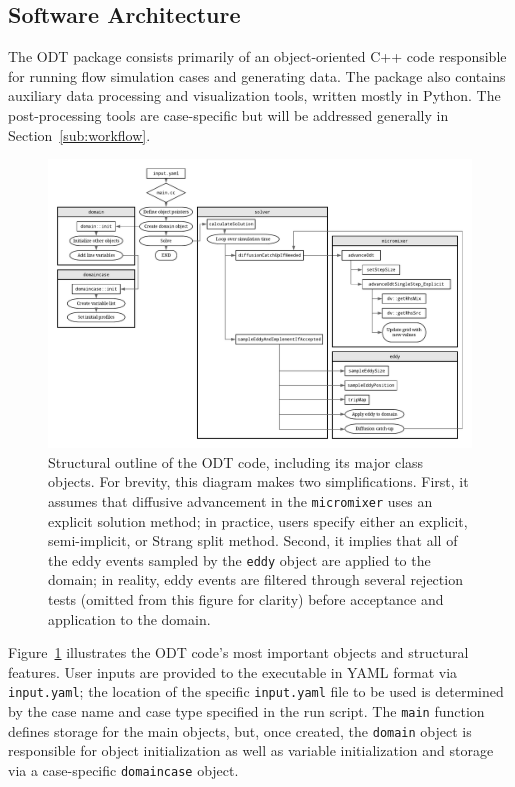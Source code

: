 \documentclass[preprint,12pt, a4paper]{elsarticle}
\begin{document}
\subsection{Software Architecture}
\label{sub:architecture}

The ODT package consists primarily of an object-oriented C++ code responsible for running flow simulation cases and generating data. The package also contains auxiliary data processing and visualization tools, written mostly in Python. The post-processing tools are case-specific but will be  addressed generally in Section~\ref{sub:workflow}. 

\begin{figure}
	\begin{center}
        \includegraphics[width=\textwidth]{fig_odt_flow_chart.pdf}
	\end{center}
	\caption{Structural outline of the ODT code, including its major class objects. For brevity, this diagram makes two simplifications. First, it assumes that diffusive advancement in the \texttt{micromixer} uses an explicit solution method; in practice, users specify either an explicit, semi-implicit, or Strang split method. Second, it implies that all of the eddy events sampled by the \texttt{eddy} object are applied to the domain; in reality, eddy events are filtered through several rejection tests (omitted from this figure for clarity) before acceptance and application to the domain.}
\label{fig:flowchart}
\end{figure}

Figure~\ref{fig:flowchart} illustrates the ODT code's most important objects and structural features. User inputs are provided to the executable in YAML \cite{Beder_2008} format via \texttt{input.yaml}; the location of the specific \texttt{input.yaml} file to be used is determined by the case name and case type specified in the run script. The \texttt{main} function defines storage for the main objects, but, once created, the \texttt{domain} object is responsible for object initialization as well as variable initialization and storage via a case-specific \texttt{domaincase} object. 
\end{document}
